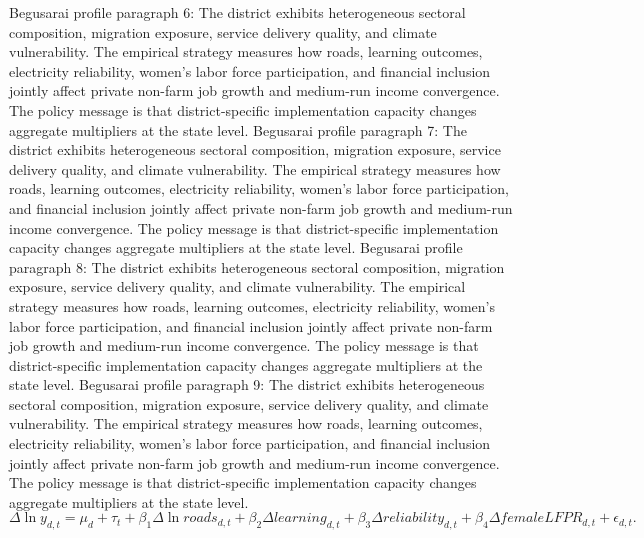 \documentclass[preprint,12pt]{elsarticle}
\begin{document}
Begusarai profile paragraph 6: The district exhibits heterogeneous sectoral composition, migration exposure, service delivery quality, and climate vulnerability. The empirical strategy measures how roads, learning outcomes, electricity reliability, women's labor force participation, and financial inclusion jointly affect private non-farm job growth and medium-run income convergence. The policy message is that district-specific implementation capacity changes aggregate multipliers at the state level.
Begusarai profile paragraph 7: The district exhibits heterogeneous sectoral composition, migration exposure, service delivery quality, and climate vulnerability. The empirical strategy measures how roads, learning outcomes, electricity reliability, women's labor force participation, and financial inclusion jointly affect private non-farm job growth and medium-run income convergence. The policy message is that district-specific implementation capacity changes aggregate multipliers at the state level.
Begusarai profile paragraph 8: The district exhibits heterogeneous sectoral composition, migration exposure, service delivery quality, and climate vulnerability. The empirical strategy measures how roads, learning outcomes, electricity reliability, women's labor force participation, and financial inclusion jointly affect private non-farm job growth and medium-run income convergence. The policy message is that district-specific implementation capacity changes aggregate multipliers at the state level.
Begusarai profile paragraph 9: The district exhibits heterogeneous sectoral composition, migration exposure, service delivery quality, and climate vulnerability. The empirical strategy measures how roads, learning outcomes, electricity reliability, women's labor force participation, and financial inclusion jointly affect private non-farm job growth and medium-run income convergence. The policy message is that district-specific implementation capacity changes aggregate multipliers at the state level.
\begin{equation}\Delta \ln y_{d,t}=\mu_d+\tau_t+\beta_1\Delta\ln roads_{d,t}+\beta_2\Delta learning_{d,t}+\beta_3\Delta reliability_{d,t}+\beta_4\Delta femaleLFPR_{d,t}+\epsilon_{d,t}.\end{equation}
\end{document}
